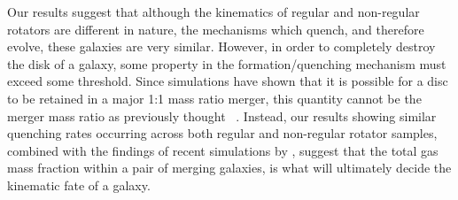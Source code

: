 \documentclass[useAMS,usenatbib]{mn2e}
\begin{document}
Our results suggest that although the kinematics of regular and non-regular rotators are different in nature, the mechanisms which quench, and therefore evolve, these galaxies are very similar. However, in order to completely destroy the disk of a galaxy, some property in the formation/quenching mechanism must exceed some threshold. Since simulations have shown that it is possible for a disc to be retained in a major 1:1 mass ratio merger, this quantity cannot be the merger mass ratio as previously thought ~\citep{binneytremaine, bois10, tonini16}. Instead, our results showing similar quenching rates occurring across both regular and non-regular rotator samples, combined with the findings of recent simulations by \cite{pontzen16, sparre16}, suggest that the total gas mass fraction within a pair of merging galaxies, is what will ultimately decide the kinematic fate of a galaxy. 


  




\end{document}
